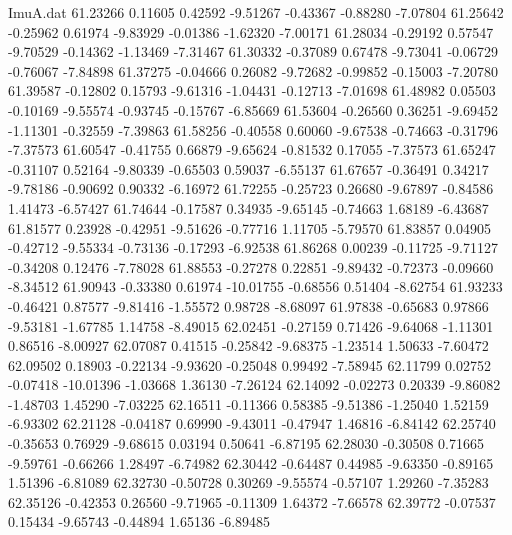 \begin{filecontents}{ImuA.dat}
  61.23266    0.11605    0.42592   -9.51267   -0.43367   -0.88280   -7.07804
  61.25642   -0.25962    0.61974   -9.83929   -0.01386   -1.62320   -7.00171
  61.28034   -0.29192    0.57547   -9.70529   -0.14362   -1.13469   -7.31467
  61.30332   -0.37089    0.67478   -9.73041   -0.06729   -0.76067   -7.84898
  61.37275   -0.04666    0.26082   -9.72682   -0.99852   -0.15003   -7.20780
  61.39587   -0.12802    0.15793   -9.61316   -1.04431   -0.12713   -7.01698
  61.48982    0.05503   -0.10169   -9.55574   -0.93745   -0.15767   -6.85669
  61.53604   -0.26560    0.36251   -9.69452   -1.11301   -0.32559   -7.39863
  61.58256   -0.40558    0.60060   -9.67538   -0.74663   -0.31796   -7.37573
  61.60547   -0.41755    0.66879   -9.65624   -0.81532    0.17055   -7.37573
  61.65247   -0.31107    0.52164   -9.80339   -0.65503    0.59037   -6.55137
  61.67657   -0.36491    0.34217   -9.78186   -0.90692    0.90332   -6.16972
  61.72255   -0.25723    0.26680   -9.67897   -0.84586    1.41473   -6.57427
  61.74644   -0.17587    0.34935   -9.65145   -0.74663    1.68189   -6.43687
  61.81577    0.23928   -0.42951   -9.51626   -0.77716    1.11705   -5.79570
  61.83857    0.04905   -0.42712   -9.55334   -0.73136   -0.17293   -6.92538
  61.86268    0.00239   -0.11725   -9.71127   -0.34208    0.12476   -7.78028
  61.88553   -0.27278    0.22851   -9.89432   -0.72373   -0.09660   -8.34512
  61.90943   -0.33380    0.61974  -10.01755   -0.68556    0.51404   -8.62754
  61.93233   -0.46421    0.87577   -9.81416   -1.55572    0.98728   -8.68097
  61.97838   -0.65683    0.97866   -9.53181   -1.67785    1.14758   -8.49015
  62.02451   -0.27159    0.71426   -9.64068   -1.11301    0.86516   -8.00927
  62.07087    0.41515   -0.25842   -9.68375   -1.23514    1.50633   -7.60472
  62.09502    0.18903   -0.22134   -9.93620   -0.25048    0.99492   -7.58945
  62.11799    0.02752   -0.07418  -10.01396   -1.03668    1.36130   -7.26124
  62.14092   -0.02273    0.20339   -9.86082   -1.48703    1.45290   -7.03225
  62.16511   -0.11366    0.58385   -9.51386   -1.25040    1.52159   -6.93302
  62.21128   -0.04187    0.69990   -9.43011   -0.47947    1.46816   -6.84142
  62.25740   -0.35653    0.76929   -9.68615    0.03194    0.50641   -6.87195
  62.28030   -0.30508    0.71665   -9.59761   -0.66266    1.28497   -6.74982
  62.30442   -0.64487    0.44985   -9.63350   -0.89165    1.51396   -6.81089
  62.32730   -0.50728    0.30269   -9.55574   -0.57107    1.29260   -7.35283
  62.35126   -0.42353    0.26560   -9.71965   -0.11309    1.64372   -7.66578
  62.39772   -0.07537    0.15434   -9.65743   -0.44894    1.65136   -6.89485

\end{filecontents}
